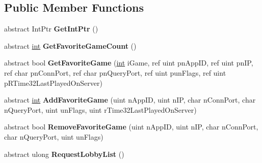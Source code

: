 \subsection*{Public Member Functions}
\begin{DoxyCompactItemize}
\item 
\hypertarget{classValve_1_1Steamworks_1_1ISteamMatchmaking_a1b10a8497ff482326048828354633f03}{}abstract Int\+Ptr {\bfseries Get\+Int\+Ptr} ()\label{classValve_1_1Steamworks_1_1ISteamMatchmaking_a1b10a8497ff482326048828354633f03}

\item 
\hypertarget{classValve_1_1Steamworks_1_1ISteamMatchmaking_aa2c7b2884617c61ad02ded321d7b62e1}{}abstract \hyperlink{SDL__thread_8h_a6a64f9be4433e4de6e2f2f548cf3c08e}{int} {\bfseries Get\+Favorite\+Game\+Count} ()\label{classValve_1_1Steamworks_1_1ISteamMatchmaking_aa2c7b2884617c61ad02ded321d7b62e1}

\item 
\hypertarget{classValve_1_1Steamworks_1_1ISteamMatchmaking_a9bb901ec55d3d053ec1b45f325445802}{}abstract bool {\bfseries Get\+Favorite\+Game} (\hyperlink{SDL__thread_8h_a6a64f9be4433e4de6e2f2f548cf3c08e}{int} i\+Game, ref uint pn\+App\+I\+D, ref uint pn\+I\+P, ref char pn\+Conn\+Port, ref char pn\+Query\+Port, ref uint pun\+Flags, ref uint p\+R\+Time32\+Last\+Played\+On\+Server)\label{classValve_1_1Steamworks_1_1ISteamMatchmaking_a9bb901ec55d3d053ec1b45f325445802}

\item 
\hypertarget{classValve_1_1Steamworks_1_1ISteamMatchmaking_a771af0c2d597fd008f06a7d9eb0ab5f4}{}abstract \hyperlink{SDL__thread_8h_a6a64f9be4433e4de6e2f2f548cf3c08e}{int} {\bfseries Add\+Favorite\+Game} (uint n\+App\+I\+D, uint n\+I\+P, char n\+Conn\+Port, char n\+Query\+Port, uint un\+Flags, uint r\+Time32\+Last\+Played\+On\+Server)\label{classValve_1_1Steamworks_1_1ISteamMatchmaking_a771af0c2d597fd008f06a7d9eb0ab5f4}

\item 
\hypertarget{classValve_1_1Steamworks_1_1ISteamMatchmaking_a0f339f13e108fbed2239487fbe680b86}{}abstract bool {\bfseries Remove\+Favorite\+Game} (uint n\+App\+I\+D, uint n\+I\+P, char n\+Conn\+Port, char n\+Query\+Port, uint un\+Flags)\label{classValve_1_1Steamworks_1_1ISteamMatchmaking_a0f339f13e108fbed2239487fbe680b86}

\item 
\hypertarget{classValve_1_1Steamworks_1_1ISteamMatchmaking_a75e3bbd72148a817b2c644970ac66c5d}{}abstract ulong {\bfseries Request\+Lobby\+List} ()\label{classValve_1_1Steamworks_1_1ISteamMatchmaking_a75e3bbd72148a817b2c644970ac66c5d}


\end{DoxyCompactItemize}
